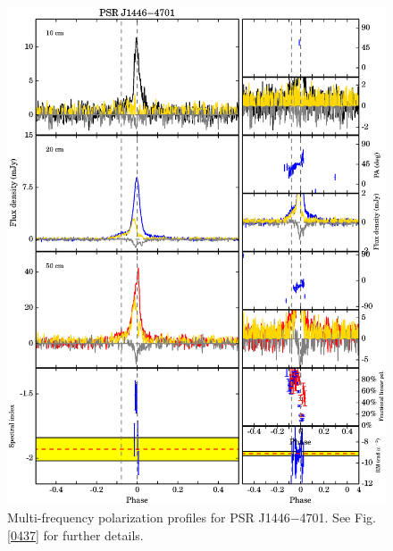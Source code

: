 \documentclass[useAMS,usenatbib]{mn2e}
\begin{document}
\begin{appendix}
\begin{figure}
\begin{center}
\includegraphics[width=6 in]{1446.ps}
\caption{Multi-frequency polarization profiles for PSR J1446$-$4701. 
See Fig. \ref{0437} for further details.}
\label{1446}
\end{center}
\end{figure}


\end{appendix}
\end{document}
